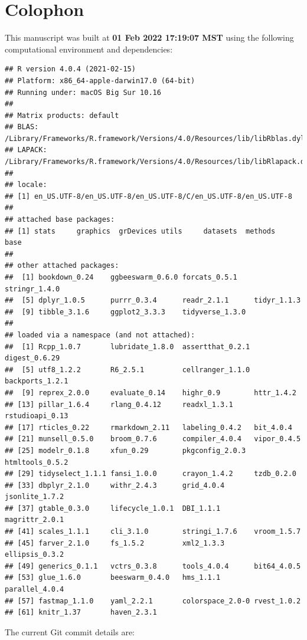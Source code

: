 \documentclass[smallextended]{svjour3}       %
\begin{document}
\hypertarget{colophon}{%
\section{Colophon}\label{colophon}}

This manuscript was built at \textbf{01 Feb 2022 17:19:07 MST} using the following computational environment and dependencies:

\begin{verbatim}
## R version 4.0.4 (2021-02-15)
## Platform: x86_64-apple-darwin17.0 (64-bit)
## Running under: macOS Big Sur 10.16
## 
## Matrix products: default
## BLAS:   /Library/Frameworks/R.framework/Versions/4.0/Resources/lib/libRblas.dylib
## LAPACK: /Library/Frameworks/R.framework/Versions/4.0/Resources/lib/libRlapack.dylib
## 
## locale:
## [1] en_US.UTF-8/en_US.UTF-8/en_US.UTF-8/C/en_US.UTF-8/en_US.UTF-8
## 
## attached base packages:
## [1] stats     graphics  grDevices utils     datasets  methods   base     
## 
## other attached packages:
##  [1] bookdown_0.24    ggbeeswarm_0.6.0 forcats_0.5.1    stringr_1.4.0   
##  [5] dplyr_1.0.5      purrr_0.3.4      readr_2.1.1      tidyr_1.1.3     
##  [9] tibble_3.1.6     ggplot2_3.3.3    tidyverse_1.3.0 
## 
## loaded via a namespace (and not attached):
##  [1] Rcpp_1.0.7       lubridate_1.8.0  assertthat_0.2.1 digest_0.6.29   
##  [5] utf8_1.2.2       R6_2.5.1         cellranger_1.1.0 backports_1.2.1 
##  [9] reprex_2.0.0     evaluate_0.14    highr_0.9        httr_1.4.2      
## [13] pillar_1.6.4     rlang_0.4.12     readxl_1.3.1     rstudioapi_0.13 
## [17] rticles_0.22     rmarkdown_2.11   labeling_0.4.2   bit_4.0.4       
## [21] munsell_0.5.0    broom_0.7.6      compiler_4.0.4   vipor_0.4.5     
## [25] modelr_0.1.8     xfun_0.29        pkgconfig_2.0.3  htmltools_0.5.2 
## [29] tidyselect_1.1.1 fansi_1.0.0      crayon_1.4.2     tzdb_0.2.0      
## [33] dbplyr_2.1.0     withr_2.4.3      grid_4.0.4       jsonlite_1.7.2  
## [37] gtable_0.3.0     lifecycle_1.0.1  DBI_1.1.1        magrittr_2.0.1  
## [41] scales_1.1.1     cli_3.1.0        stringi_1.7.6    vroom_1.5.7     
## [45] farver_2.1.0     fs_1.5.2         xml2_1.3.3       ellipsis_0.3.2  
## [49] generics_0.1.1   vctrs_0.3.8      tools_4.0.4      bit64_4.0.5     
## [53] glue_1.6.0       beeswarm_0.4.0   hms_1.1.1        parallel_4.0.4  
## [57] fastmap_1.1.0    yaml_2.2.1       colorspace_2.0-0 rvest_1.0.2     
## [61] knitr_1.37       haven_2.3.1
\end{verbatim}

The current Git commit details are:
\end{document}
